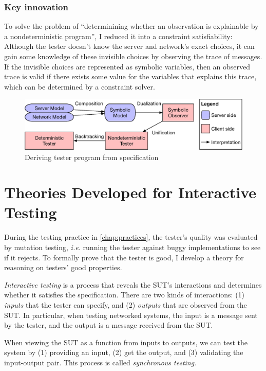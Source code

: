 \documentclass[12pt,oneside]{amsbook}
\numberwithin{section}{chapter}
\numberwithin{figure}{chapter}
\numberwithin{equation}{chapter}
\begin{document}
\subsection{Key innovation}
To solve the problem of ``determinining whether an observation is explainable by
a nondeterministic program'', I reduced it into a constraint
satisfiability: Although the tester doesn't know the server and network's exact
choices, it can gain some knowledge of these invisible choices by observing the
trace of messages.  If the invisible choices are represented as symbolic
variables, then an observed trace is valid if there exists some value for the
variables that explains this trace, which can be determined by a constraint
solver.

\begin{figure}
  \includegraphics[width=\linewidth]{figures/framework}
  \caption{Deriving tester program from specification}
  \label{fig:framework}
\end{figure}

\chapter{Theories Developed for Interactive Testing}
\label{chap:theories}
During the testing practice in \autoref{chap:practices}, the tester's quality was
evaluated by mutation testing, {\it i.e.} running the tester against buggy
implementations to see if it rejects.  To formally prove that the tester is
good, I develop a theory for reasoning on testers' good properties.

{\em Interactive testing} is a process that reveals the SUT's interactions and
determines whether it satisfies the specification.  There are two kinds of
interactions: (1) {\em inputs} that the tester can specify, and (2) {\em
  outputs} that are observed from the SUT.  In particular, when testing
networked systems, the input is a message sent by the tester, and the output is
a message received from the SUT.

When viewing the SUT as a function from inputs to outputs, we can test the
system by (1) providing an input, (2) get the output, and (3) validating the
input-output pair.  This process is called {\em synchronous testing}.
\end{document}
